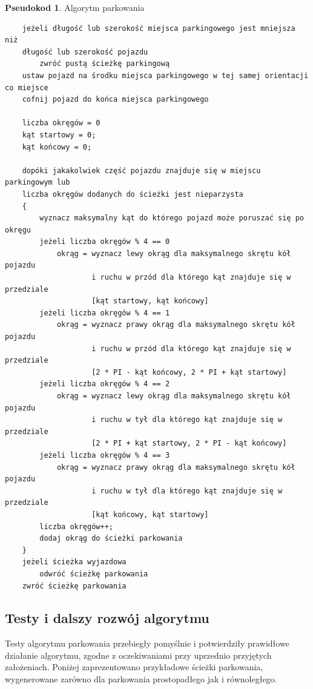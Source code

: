 \documentclass[a4paper,11pt,twoside]{report}
\theoremstyle{definition}
\newtheorem{pseudokod}{Pseudokod}[subsection]
\begin{document}
\begin{pseudokod}
Algorytm parkowania
\begin{verbatim}
    jeżeli długość lub szerokość miejsca parkingowego jest mniejsza niż 
    długość lub szerokość pojazdu
        zwróć pustą ścieżkę parkingową
    ustaw pojazd na środku miejsca parkingowego w tej samej orientacji co miejsce
    cofnij pojazd do końca miejsca parkingowego

    liczba okręgów = 0
    kąt startowy = 0;
    kąt końcowy = 0;
	
    dopóki jakakolwiek część pojazdu znajduje się w miejscu parkingowym lub 
    liczba okręgów dodanych do ścieżki jest nieparzysta
    {
        wyznacz maksymalny kąt do którego pojazd może poruszać się po okręgu
        jeżeli liczba okręgów % 4 == 0
            okrąg = wyznacz lewy okrąg dla maksymalnego skrętu kół pojazdu 
                    i ruchu w przód dla którego kąt znajduje się w przedziale 
                    [kąt startowy, kąt końcowy]
        jeżeli liczba okręgów % 4 == 1
            okrąg = wyznacz prawy okrąg dla maksymalnego skrętu kół pojazdu 
                    i ruchu w przód dla którego kąt znajduje się w przedziale 
                    [2 * PI - kąt końcowy, 2 * PI + kąt startowy]
        jeżeli liczba okręgów % 4 == 2
            okrąg = wyznacz lewy okrąg dla maksymalnego skrętu kół pojazdu 
                    i ruchu w tył dla którego kąt znajduje się w przedziale 
                    [2 * PI + kąt startowy, 2 * PI - kąt końcowy]
        jeżeli liczba okręgów % 4 == 3
            okrąg = wyznacz prawy okrąg dla maksymalnego skrętu kół pojazdu 
                    i ruchu w tył dla którego kąt znajduje się w przedziale 
                    [kąt końcowy, kąt startowy]
        liczba okręgów++;
        dodaj okrąg do ścieżki parkowania
    }
    jeżeli ścieżka wyjazdowa
        odwróć ścieżkę parkowania	
    zwróć ścieżkę parkowania
\end{verbatim}
\end{pseudokod}

\subsection{Testy i dalszy rozwój algorytmu}

Testy algorytmu parkowania przebiegły pomyślnie i potwierdziły prawidłowe działanie algorytmu, zgodne z oczekiwaniami przy uprzednio przyjętych założeniach. Poniżej zaprezentowano przykładowe ścieżki parkowania, wygenerowane zarówno dla parkowania prostopadłego jak i równoległego.
\end{document}
